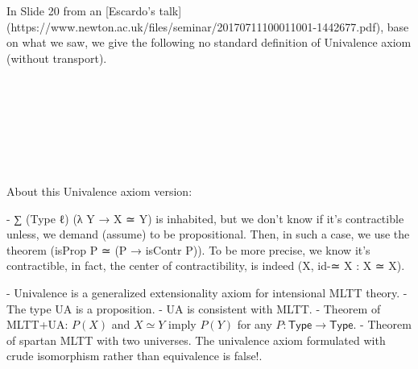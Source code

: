 In Slide 20 from an [Escardo's talk](https://www.newton.ac.uk/files/seminar/20170711100011001-1442677.pdf), base on what we saw, we give
the following no standard definition of Univalence axiom (without transport).

\begin{code}%
%
\>[2]\<%
\\
\>[2][@{}l@{\AgdaIndent{0}}]%
\>[4]\AgdaSymbol{:}\AgdaSpace{}%
\AgdaSpace{}%
\AgdaSymbol{\{}\AgdaSymbol{\}}\<%
\\
%
\>[4]\AgdaSpace{}%
\AgdaSymbol{(}\AgdaSpace{}%
\AgdaSymbol{(}\AgdaSpace{}%
\AgdaSymbol{))}\<%
\\
%
\\[\AgdaEmptyExtraSkip]%
%
\>[2]\AgdaSpace{}%
\AgdaSymbol{\{}\AgdaSpace{}%
\AgdaSymbol{=}\AgdaSpace{}%
\AgdaSymbol{\}}%
\>[14]\AgdaSymbol{=}\<%
\\
\>[2][@{}l@{\AgdaIndent{0}}]%
\>[4]\AgdaSymbol{(}\AgdaSpace{}%
\AgdaSymbol{:}\AgdaSpace{}%
\AgdaSpace{}%
\AgdaSymbol{)}\AgdaSpace{}%
\AgdaSpace{}%
\AgdaSpace{}%
\AgdaSymbol{(}\AgdaSpace{}%
\AgdaSpace{}%
\AgdaSymbol{(}\AgdaSpace{}%
\AgdaSymbol{)}\AgdaSpace{}%
\AgdaSpace{}%
\AgdaSpace{}%
\AgdaSpace{}%
\AgdaSymbol{(}\AgdaSpace{}%
\AgdaSpace{}%
\AgdaSymbol{)}\AgdaSpace{}%
\AgdaSymbol{))}\<%
\\
%
\>[4]\AgdaSpace{}%
\AgdaSpace{}%
%
\>[23]\<%
\end{code}

About this Univalence axiom version:

  - ∑ (Type ℓ) (λ Y → X ≃ Y) is inhabited, but we don't know if it's contractible
  unless, we demand (assume) to be propositional. Then, in such a case,
  we use the theorem (isProp P ≃ (P → isContr P)). To be more precise, we know it's contractible, in fact, the center of contractibility, is indeed (X, id-≃ X : X ≃ X).

  - Univalence is a generalized extensionality axiom for intensional MLTT theory.
  - The type UA is a proposition.
  - UA is consistent with MLTT.
  - Theorem of MLTT+UA: $P(X)$ and $X≃Y$ imply $P(Y)$ for any $P : \mathsf{Type} → \mathsf{Type}$.
  - Theorem of spartan MLTT with two universes. The univalence axiom formulated
with crude isomorphism rather than equivalence is false!.

